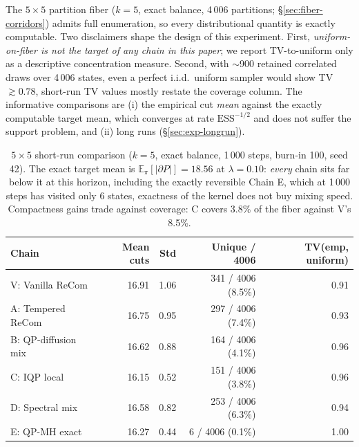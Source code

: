 \documentclass[11pt]{article}
\newcommand{\E}{\mathbb{E}}
\begin{document}
The $5 \times 5$ partition fiber ($k = 5$, exact balance, 4\,006
partitions; \S\ref{sec:fiber-corridors}) admits full enumeration, so
every distributional quantity is exactly computable. Two disclaimers
shape the design of this experiment. First, \emph{uniform-on-fiber is
not the target of any chain in this paper}; we report TV-to-uniform
only as a descriptive concentration measure. Second, with $\sim$900
retained correlated draws over 4\,006 states, even a perfect
i.i.d.\ uniform sampler would show TV $\gtrsim 0.78$, short-run TV
values mostly restate the coverage column. The informative
comparisons are (i) the empirical cut \emph{mean} against the exactly
computable target mean, which converges at rate
$\mathrm{ESS}^{-1/2}$ and does not suffer the support problem, and
(ii) long runs (\S\ref{sec:exp-longrun}).

\begin{table}[H]
\centering
\small
\begin{tabular}{lrrrr}
\toprule
Chain & Mean cuts & Std & Unique / 4006 & TV(emp, uniform) \\
\midrule
V: Vanilla ReCom     & 16.91 & 1.06 & 341 / 4006 (8.5\%) & 0.91 \\
A: Tempered ReCom    & 16.75 & 0.95 & 297 / 4006 (7.4\%) & 0.93 \\
B: QP-diffusion mix  & 16.62 & 0.88 & 164 / 4006 (4.1\%) & 0.96 \\
C: IQP local         & 16.15 & 0.52 & 151 / 4006 (3.8\%) & 0.96 \\
D: Spectral mix      & 16.58 & 0.82 & 253 / 4006 (6.3\%) & 0.94 \\
E: QP-MH exact       & 16.27 & 0.44 & \phantom{00}6 / 4006 (0.1\%) & 1.00 \\
\bottomrule
\end{tabular}
\caption{$5 \times 5$ short-run comparison ($k = 5$, exact balance,
  1\,000 steps, burn-in 100, seed 42). The exact target mean is
  $\E_\pi[|\partial P|] = 18.56$ at $\lambda = 0.10$: \emph{every}
  chain sits far below it at this horizon, including the exactly
  reversible Chain E, which at 1\,000 steps has visited only 6 states, exactness of the kernel does not buy mixing speed. Compactness
  gains trade against coverage: C covers 3.8\% of the fiber against
  V's 8.5\%.}\label{tab:5x5-headline}
\end{table}
\end{document}

